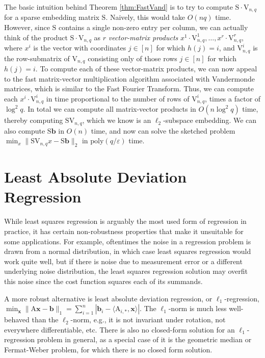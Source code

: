 \documentclass[11pt]{article}
\newcommand{\mat}[1]{{\ensuremath{\bm{\mathrm{#1}}}}}
\def\b{{\mathbf b}}
\def\matA{\mat{A}}
\def\matS{\mat{S}}
\def\matV{\mat{V}}
\def\x{{\mathbf x}}
\def\b{{\mathbf b}}
\newcommand{\eps}{\varepsilon}
\newcommand{\poly}{{\mathrm{poly}}}
\begin{document}
The basic intuition behind Theorem \ref{thm:FastVand} is to try to compute $\matS \cdot \matV_{n,q}$ for
a sparse embedding matrix $\matS$. Naively, this would take $O(nq)$ time. However, since $\matS$ contains
a single non-zero entry per column, we can actually think of the product $\mat S \cdot \matV_{n,q}$ as
$r$ {\it vector-matrix products} $x^1 \cdot \matV^1_{n,q}, \ldots, x^r \cdot \matV^r_{n,q}$, where $x^i$ is the vector
with coordinates $j \in [n]$ for which $h(j) = i$, and $\matV^i_{n,q}$ is the row-submatrix of $\matV_{n,q}$
consisting only of those rows $j \in [n]$ for which $h(j) = i$.  To compute each of these vector-matrix products,
we can now appeal to the fast matrix-vector multiplication algorithm associated with Vandermonde matrices, which
is similar to the Fast Fourier Transform. Thus, we can compute each $x^i \cdot \matV^i_{n,q}$ in time proportional
to the number of rows of $\matV^i_{n,q}$, times a factor of $\log^2 q$. In total we can compute all matrix-vector
products in $O(n \log^2 q)$ time, thereby computing $\matS \matV_{n,q}$, which we know is an $\ell_2$-subspace
embedding. We can also compute $\matS \b$ in $O(n)$ time, and now can solve the sketched problem
$\min_x \|\matS\matV_{n,q}x-\matS\b\|_2$ in $\poly(q/\eps)$ time. 

\section{Least Absolute Deviation Regression}\label{chap:robust}
While least squares regression is arguably the most used form of regression in practice, it
has certain non-robustness properties that make it unsuitable for some applications. For
example, oftentimes the noise in a regression problem is drawn from a normal distribution, in 
which case least squares regression would work quite well, but if there is noise due to 
measurement error or a different underlying noise distribution, the least squares 
regression solution may overfit this noise since the cost function squares each of its 
summands. 

A more robust alternative is least absolute deviation regression, or $\ell_1$-regression, 
$\min_{\x} \|\matA \x- \b\|_1 = \sum_{i=1}^n |\b_i - \langle \matA_{i,*}, \x \rangle |$. The $\ell_1$-norm
is much less well-behaved than the $\ell_2$-norm, e.g., it is not invariant under rotation,
not everywhere differentiable, etc. There is also no closed-form solution for an
$\ell_1$-regression problem in general, as a special case of it is the geometric median
or Fermat-Weber problem, for which there is no closed form solution. 
\end{document}
